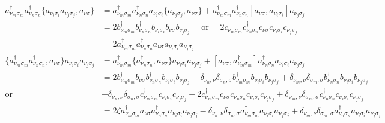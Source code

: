 \documentclass[a4paper,12pts]{article}
\numberwithin{equation}{section}
\begin{document}
	\begin{align}
	a^{\dagger}_{\nu_m\sigma_m}a^{\dagger}_{\nu_n\sigma_n}\{a_{\nu_i\sigma_i}a_{\nu_j\sigma_j},a_{\nu\sigma}\} &= a^{\dagger}_{\nu_m\sigma_m}a^{\dagger}_{\nu_n\sigma_n}a_{\nu_i\sigma_i}\{a_{\nu_j\sigma_j},a_{\nu\sigma}\} + a^{\dagger}_{\nu_m\sigma_m}a^{\dagger}_{\nu_n\sigma_n}[a_{\nu\sigma},a_{\nu_i\sigma_i}]a_{\nu_j\sigma_j}\\
	&= 2b^{\dagger}_{\nu_m\sigma_m}b^{\dagger}_{\nu_n\sigma_n}b_{\nu_i\sigma_i}b_{\nu\sigma}b_{\nu_j\sigma_j}\quad\text{ or }\quad 2c^{\dagger}_{\nu_m\sigma_m}c^{\dagger}_{\nu_n\sigma_n}c_{\nu\sigma}c_{\nu_i\sigma_i}c_{\nu_j\sigma_j}\\
	&= 2a^{\dagger}_{\nu_m\sigma_m}a^{\dagger}_{\nu_n\sigma_n}a_{\nu\sigma}a_{\nu_i\sigma_i}a_{\nu_j\sigma_j}\\
	\{a^{\dagger}_{\nu_m\sigma_m}a^{\dagger}_{\nu_n\sigma_n},a_{\nu\sigma}\}a_{\nu_i\sigma_i}a_{\nu_j\sigma_j} &= a^{\dagger}_{\nu_m\sigma_m}\{a^{\dagger}_{\nu_n\sigma_n},a_{\nu\sigma}\}a_{\nu_i\sigma_i}a_{\nu_j\sigma_j} + [a_{\nu\sigma},a^{\dagger}_{\nu_m\sigma_m}]a^{\dagger}_{\nu_n\sigma_n}a_{\nu_i\sigma_i}a_{\nu_j\sigma_j}\\
	&= 2b^{\dagger}_{\nu_m\sigma_m}b_{\nu\sigma}b^{\dagger}_{\nu_n\sigma_n}b_{\nu_i\sigma_i}b_{\nu_j\sigma_j} - \delta_{\nu_n,\nu}\delta_{\sigma_n,\sigma}b^{\dagger}_{\nu_m\sigma_m}b_{\nu_i\sigma_i}b_{\nu_j\sigma_j} + \delta_{\nu_m,\nu}\delta_{\sigma_m,\sigma}b^{\dagger}_{\nu_n\sigma_n}b_{\nu_i\sigma_i}b_{\nu_j\sigma_j}\nonumber\\
	\text{or}\quad& -\delta_{\nu_n,\nu}\delta_{\sigma_n,\sigma}c^{\dagger}_{\nu_m\sigma_m}c_{\nu_i\sigma_i}c_{\nu_j\sigma_j} - 2c^{\dagger}_{\nu_m\sigma_m}c_{\nu\sigma}c^{\dagger}_{\nu_n\sigma_n}c_{\nu_i\sigma_i}c_{\nu_j\sigma_j} + \delta_{\nu_m,\nu}\delta_{\sigma_m,\sigma}c^{\dagger}_{\nu_n\sigma_n}c_{\nu_i\sigma_i}c_{\nu_j\sigma_j}\\
	&= 2\zeta a^{\dagger}_{\nu_m\sigma_m}a_{\nu\sigma}a^{\dagger}_{\nu_n\sigma_n}a_{\nu_i\sigma_i}a_{\nu_j\sigma_j} - \delta_{\nu_n,\nu}\delta_{\sigma_n,\sigma}a^{\dagger}_{\nu_m\sigma_m}a_{\nu_i\sigma_i}a_{\nu_j\sigma_j} + \delta_{\nu_m,\nu}\delta_{\sigma_m,\sigma}a^{\dagger}_{\nu_n\sigma_n}a_{\nu_i\sigma_i}a_{\nu_j\sigma_j}
	\end{align}
\end{document}

